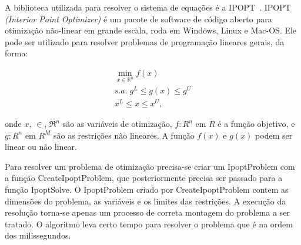 A biblioteca utilizada para resolver o sistema de equações é a IPOPT~\citep{point}. IPOPT \emph{(Interior Point Optimizer)} é um pacote de software de código aberto para otimização não-linear em grande escala, roda em Windows, Linux e Mac-OS. Ele pode ser utilizado para resolver problemas de programação lineares gerais, da forma:

\begin{eqnarray}
\displaystyle \min_{x\in\mathbb{R}^n} 
	\displaystyle f(x) \\
	s.a.\displaystyle \;  \nonumber 
	 	\displaystyle g^L \leq g(x) \leq g^U  \nonumber \\	
 	 	\displaystyle x^L \leq x \leq x^U, \nonumber 
\end{eqnarray}

onde $x$, $\in$, $\Re ^ n$ são as variáveis de otimização, $f : R^n$ em $R$ é a função objetivo, e $g: R^n$ em $R^M$ são as restrições não lineares. A função $f(x)$ e $g(x)$ podem ser linear ou não linear.  

Para resolver um problema de otimização precisa-se criar um IpoptProblem com a função CreateIpoptProblem, que posteriormente precisa ser passado para a função IpoptSolve. O IpoptProblem criado por CreateIpoptProblem contem as dimensões do problema, as variáveis e os limites das restrições. A execução da resolução torna-se apenas um processo de correta montagem do problema a ser tratado. O algoritmo leva certo tempo para resolver o problema que é na ordem dos milissegundos. 


